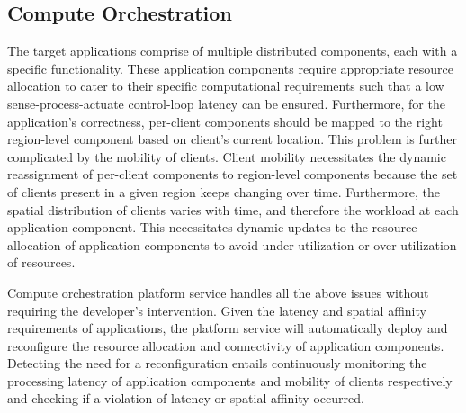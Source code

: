 \subsection{Compute Orchestration}
The target applications comprise of multiple distributed components, each with a specific functionality. These application components require appropriate resource allocation to cater to their specific computational requirements such that a low sense-process-actuate control-loop latency can be ensured. Furthermore, for the application's correctness, per-client components should be mapped to the right region-level component based on client's current location. This problem is further complicated by the mobility of clients. Client mobility necessitates the dynamic reassignment of per-client components to region-level components because the set of clients present in a given region keeps changing over time. Furthermore, the spatial distribution of clients varies with time, and therefore the workload at each application component. This necessitates dynamic updates to the resource allocation of application components to avoid under-utilization or over-utilization of resources. 
\par Compute orchestration platform service handles all the above issues without requiring the developer's intervention. Given the latency and spatial affinity requirements of applications, the platform service will automatically deploy and reconfigure the resource allocation and connectivity of application components. Detecting the need for a reconfiguration entails continuously monitoring the processing latency of application components and mobility of clients respectively and checking if a violation of latency or spatial affinity occurred.

